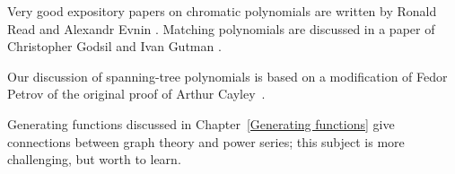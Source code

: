 Very good expository papers on chromatic polynomials are written by
Ronald Read \cite{read} and Alexandr Evnin \cite{evnin-chnom}. 
Matching polynomials are discussed in a paper of Christopher Godsil and Ivan Gutman \cite{godsil-gutman}.

Our discussion of spanning-tree polynomials is based on a modification of Fedor Petrov \cite{petrov} of the original proof of Arthur Cayley~\cite{cayley}. 

Generating functions discussed in Chapter~\ref{Generating functions} give connections between graph theory and power series; this subject is more challenging, but worth to learn.   
